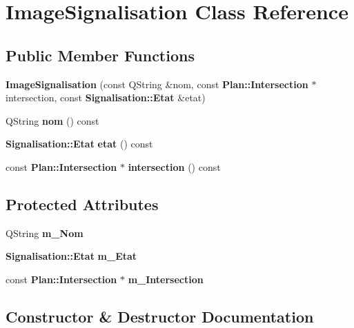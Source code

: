 \section{\-Image\-Signalisation \-Class \-Reference}
\label{class_image_signalisation}
\subsection*{\-Public \-Member \-Functions}
\begin{DoxyCompactItemize}
\item 
{\bf \-Image\-Signalisation} (const \-Q\-String \&nom, const {\bf \-Plan\-::\-Intersection} $\ast$intersection, const {\bf \-Signalisation\-::\-Etat} \&etat)
\item 
\-Q\-String {\bfseries nom} () const \label{class_image_signalisation_adc2c3d37b140f6c3df8db09b1597d916}

\item 
{\bf \-Signalisation\-::\-Etat} {\bfseries etat} () const \label{class_image_signalisation_a114d9ad0fb4e5fa20eead7e3e47f4ebb}

\item 
const {\bf \-Plan\-::\-Intersection} $\ast$ {\bfseries intersection} () const \label{class_image_signalisation_a22fa79416827416032625d04d73383e3}

\end{DoxyCompactItemize}
\subsection*{\-Protected \-Attributes}
\begin{DoxyCompactItemize}
\item 
\-Q\-String {\bfseries m\-\_\-\-Nom}\label{class_image_signalisation_a24d6a0c9204a97c417e71196f393b2aa}

\item 
{\bf \-Signalisation\-::\-Etat} {\bfseries m\-\_\-\-Etat}\label{class_image_signalisation_ae8ea46d14593e43d597f6b5184f32935}

\item 
const {\bf \-Plan\-::\-Intersection} $\ast$ {\bfseries m\-\_\-\-Intersection}\label{class_image_signalisation_ad1effc831d2bf4c796072a755043a16d}

\end{DoxyCompactItemize}


\subsection{\-Constructor \& \-Destructor \-Documentation}

